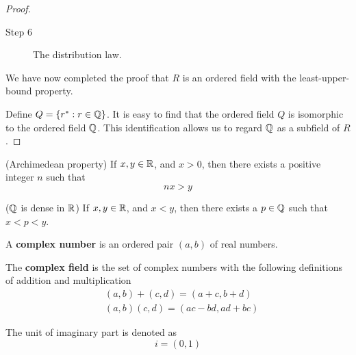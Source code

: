 \begin{framed}
\begin{proof}
\begin{description}
            \item[Step 6] The distribution law. 
        \end{description}
        
        We have now completed the proof that $R$ is an ordered field with the least-upper-bound property.

        Define $Q = \{ r^* : r \in \mathbb{Q} \}$. It is easy to find that the ordered field $Q$ is isomorphic to the ordered field $\mathbb{Q}$. This identification allows us to regard $\mathbb{Q}$ as a subfield of $R$.
    \end{proof}
    \end{framed}

    \begin{theo}
        (Archimedean property) If $x,y \in \mathbb{R}$, and $x > 0$, then there exists a positive integer $n$ such that
        \begin{equation}
            nx > y
        \end{equation}
    \end{theo}
    
    \begin{theo}
        ($\mathbb{Q}$ is dense in $\mathbb{R}$) If $x, y \in \mathbb{R}$, and $x < y$, then there exists a $p \in \mathbb{Q}$ such that $x < p < y$.
    \end{theo}

    \begin{defi}
        A \textbf{complex number} is an ordered pair $(a,b)$ of real numbers.
    \end{defi}
    \begin{defi}
        The \textbf{complex field} is the set of complex numbers with the following definitions of addition and multiplication
        \begin{align*}
            &(a,b) + (c,d) = (a+c, b+d) \\
            &(a,b)(c,d) = (ac-bd, ad+bc)
        \end{align*}
    \end{defi}

    \begin{defi} The unit of imaginary part is denoted as
        \begin{equation}
            i = (0, 1)
        \end{equation}
    \end{defi}